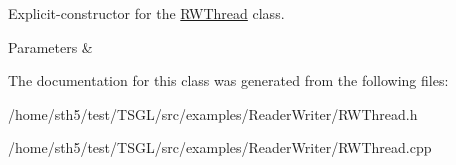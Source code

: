 Explicit-\/constructor for the \hyperlink{class_r_w_thread}{R\+W\+Thread} class. 


\begin{DoxyParams}{Parameters}
{\em } & \\
\hline
\end{DoxyParams}


The documentation for this class was generated from the following files\+:\begin{DoxyCompactItemize}
\item 
/home/sth5/test/\+T\+S\+G\+L/src/examples/\+Reader\+Writer/R\+W\+Thread.\+h\item 
/home/sth5/test/\+T\+S\+G\+L/src/examples/\+Reader\+Writer/R\+W\+Thread.\+cpp\end{DoxyCompactItemize}
